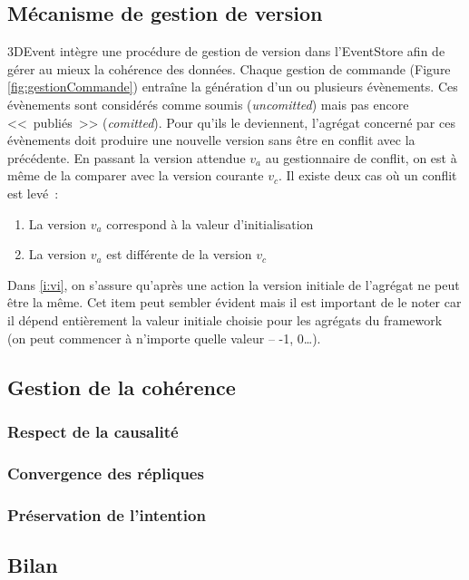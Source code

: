 \subsection{Mécanisme de gestion de version}
3DEvent intègre une procédure de gestion de version dans l'\gls{EventStore} afin 
de gérer au mieux la cohérence des données. 
Chaque gestion de commande (Figure \ref{fig:gestionCommande}) entraîne la 
génération d'un ou plusieurs évènements. Ces évènements sont considérés 
comme \og soumis\fg{} (\textit{uncomitted}) mais pas encore <<~publiés~>> 
(\textit{comitted}).  Pour qu'ils le deviennent, l'agrégat concerné par ces 
évènements doit produire une nouvelle version sans être en conflit avec la 
précédente. En passant la version attendue $v_a$ au gestionnaire de conflit, on 
est à même de la comparer avec la version courante $v_c$. Il existe deux cas où 
un conflit est levé~: 
\begin{enumerate}[label=\alph*)]
	\item \label{i:vi} La version $v_a$ correspond à la valeur d'initialisation
	\item \label{i:vdiff} La version $v_a$ est différente de la version $v_c$
\end{enumerate}
Dans \ref{i:vi}, on s'assure qu'après une action la version initiale de l'agrégat ne 
peut être la même. Cet item peut sembler évident mais il est important de le noter 
car il dépend entièrement la valeur initiale choisie pour les agrégats du 
\gls{framework} (on peut commencer à n'importe quelle valeur -- -1, 0\ldots).



\subsection{Gestion de la cohérence}


\subsubsection{Respect de la causalité}
\subsubsection{Convergence des répliques}
\subsubsection{Préservation de l'intention}
\subsection{Bilan}